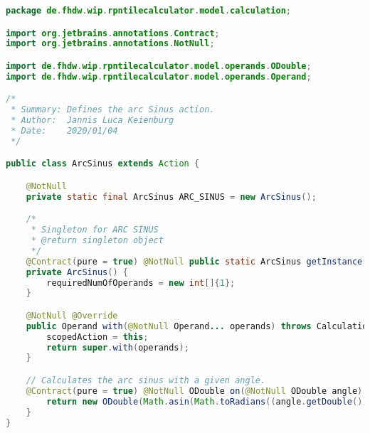 \begin{lstlisting}[caption=ArcSinus (Keienburg),label=list:ArcSinus,language=Java]
package de.fhdw.wip.rpntilecalculator.model.calculation;

import org.jetbrains.annotations.Contract;
import org.jetbrains.annotations.NotNull;

import de.fhdw.wip.rpntilecalculator.model.operands.ODouble;
import de.fhdw.wip.rpntilecalculator.model.operands.Operand;

/*
 * Summary: Defines the arc Sinus action.
 * Author:  Jannis Luca Keienburg
 * Date:    2020/01/04
 */

public class ArcSinus extends Action {

    @NotNull
    private static final ArcSinus ARC_SINUS = new ArcSinus();

    /*
     * Singleton for ARC SINUS
     * @return singleton object
     */
    @Contract(pure = true) @NotNull public static ArcSinus getInstance() { return ARC_SINUS; }
    private ArcSinus() {
        requiredNumOfOperands = new int[]{1};
    }

    @NotNull @Override
    public Operand with(@NotNull Operand... operands) throws CalculationException {
        scopedAction = this;
        return super.with(operands);
    }

    // Calculates the arc sinus with a given angle.
    @Contract(pure = true) @NotNull ODouble on(@NotNull ODouble angle) {
        return new ODouble(Math.asin(Math.toRadians((angle.getDouble()))));
    }
}
\end{lstlisting}    

